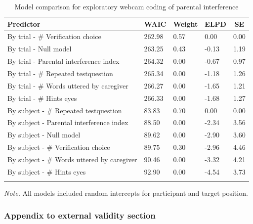 \documentclass[
  man,floatsintext]{apa6}
\begin{document}
\begin{table}[tbp]

\begin{center}
\begin{threeparttable}

\caption{\label{tab:webcam_table}Model comparison for exploratory webcam coding of parental interference}

\begin{tabular}{lllll}
\toprule
Predictor & \multicolumn{1}{c}{WAIC} & \multicolumn{1}{c}{Weight} & \multicolumn{1}{c}{ELPD} & \multicolumn{1}{c}{SE}\\
\midrule
By trial - \# Verification choice & 262.98 & 0.57 & 0.00 & 0.00\\
By trial - Null model & 263.25 & 0.43 & -0.13 & 1.19\\
By trial - Parental interference index & 264.32 & 0.00 & -0.67 & 0.97\\
By trial - \# Repeated testquestion & 265.34 & 0.00 & -1.18 & 1.26\\
By trial - \# Words uttered by caregiver & 266.27 & 0.00 & -1.65 & 1.21\\
By trial - \# Hints eyes & 266.33 & 0.00 & -1.68 & 1.27\\
By subject - \# Repeated testquestion & 83.83 & 0.70 & 0.00 & 0.00\\
By subject - Parental interference index & 88.50 & 0.00 & -2.34 & 3.56\\
By subject - Null model & 89.62 & 0.00 & -2.90 & 3.60\\
By subject - \# Verification choice & 89.75 & 0.30 & -2.96 & 4.46\\
By subject - \# Words uttered by caregiver & 90.46 & 0.00 & -3.32 & 4.21\\
By subject - \# Hints eyes & 92.90 & 0.00 & -4.54 & 3.73\\
\bottomrule
\addlinespace
\end{tabular}

\begin{tablenotes}[para]
\normalsize{\textit{Note.} All models included random intercepts for participant and target position.}
\end{tablenotes}

\end{threeparttable}
\end{center}

\end{table}

\hypertarget{appendix-to-external-validity-section}{%
\subsubsection{Appendix to external validity section}\label{appendix-to-external-validity-section}}
\end{document}
